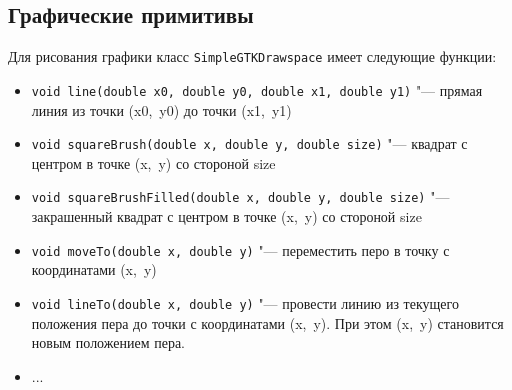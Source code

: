 \documentclass[a4paper,11pt]{article}
\begin{document}
\subsection{Графические примитивы}
Для рисования графики класс \verb!SimpleGTKDrawspace! имеет следующие функции:
\begin{itemize}
	\item \verb!void line(double x0, double y0, double x1, double y1)! "--- прямая линия из точки (x0,~y0) до точки (x1,~y1)
	\item \verb!void squareBrush(double x, double y, double size)! "--- квадрат с центром в точке (x,~y) со стороной size
	\item \verb!void squareBrushFilled(double x, double y, double size)! "--- закрашенный квадрат с центром в точке (x,~y) со стороной size
	\item \verb!void moveTo(double x, double y)! "--- переместить перо в точку с координатами (x,~y)
	\item \verb!void lineTo(double x, double y)! "--- провести линию из текущего положения пера до точки с координатами (x,~y). При этом (x,~y) становится новым положением пера.
	\item ...
\end{itemize}
\end{document}
